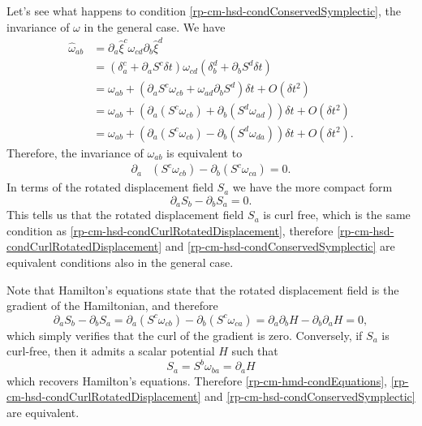 Let's see what happens to condition \ref{rp-cm-hsd-condConservedSymplectic}, the invariance of $\omega$ in the general case. We have
\begin{equation}
	\begin{aligned}
	\hat{\omega}_{ab} &= \partial_a \hat{\xi}^c \omega_{cd} \partial_b \hat{\xi}^d \\ &= \left(\delta_a^c + \partial_a S^c \delta t\right) \omega_{cd} \left(\delta_b^d + \partial_b S^d \delta t\right) \\
	&= \omega_{ab} + \left(\partial_a S^c \omega_{cb} + \omega_{ad} \partial_b S^d \right) \delta t + O(\delta t^2) \\
	&= \omega_{ab} + \left(\partial_a (S^c \omega_{cb}) + \partial_b ( S^d \omega_{ad}) \right) \delta t + O(\delta t^2) \\
	&= \omega_{ab} + \left(\partial_a (S^c \omega_{cb}) - \partial_b ( S^d \omega_{d a}  ) \right) \delta t + O(\delta t^2).
	\end{aligned}
\end{equation}
Therefore, the invariance of $\omega_{ab}$ is equivalent to
\begin{equation}
	\begin{aligned}
	\partial_a &(S^c \omega_{cb} ) - \partial_b (S^c \omega_{ca} ) = 0.
	\end{aligned}
\end{equation}
In terms of the rotated displacement field $S_a$ we have the more compact form
\begin{equation}
	\partial_a S_b - \partial_b S_a = 0.
\end{equation}
This tells us that the rotated displacement field $S_a$ is curl free, which is the same condition as \ref{rp-cm-hsd-condCurlRotatedDisplacement}, therefore \ref{rp-cm-hsd-condCurlRotatedDisplacement} and \ref{rp-cm-hsd-condConservedSymplectic} are equivalent conditions also in the general case.

Note that Hamilton's equations state that the rotated displacement field is the gradient of the Hamiltonian, and therefore
\begin{equation}
	\partial_a S_b - \partial_b S_a = \partial_a (S^c \omega_{cb}) - \partial_b (S^c \omega_{ca}) =  \partial_a \partial_b H - \partial_b \partial_a H = 0,
\end{equation}
which simply verifies that the curl of the gradient is zero. Conversely, if $S_a$ is curl-free, then it admits a scalar potential $H$ such that
\begin{equation}
	S_a = S^b \omega_{ba} = \partial_a H
\end{equation}
which recovers Hamilton's equations. Therefore \ref{rp-cm-hmd-condEquations}, \ref{rp-cm-hsd-condCurlRotatedDisplacement} and \ref{rp-cm-hsd-condConservedSymplectic} are equivalent.


